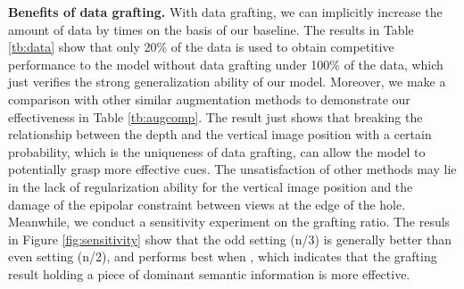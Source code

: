 \documentclass[10pt,twocolumn,letterpaper]{article}
\begin{document}
\noindent
{\bf Benefits of data grafting.} With data grafting, we can implicitly increase the 
amount of data by  times on the basis of our baseline. The 
results in Table \ref{tb:data} show that only 20\% of the data is used to obtain 
competitive performance to the model without data grafting under 100\% of the data, 
which just verifies the strong generalization ability of our model. Moreover, we 
make a comparison with other similar augmentation methods to demonstrate our 
effectiveness in Table \ref{tb:augcomp}. The result just shows that breaking the 
relationship between the depth and the vertical image position with a 
certain probability, which is the uniqueness of data grafting, can allow the model to 
potentially grasp more effective cues. The unsatisfaction of other methods may lie in 
the lack of regularization ability for the vertical image position and the damage of the 
epipolar constraint between views at the edge of the hole. Meanwhile, we 
conduct a sensitivity experiment on the grafting ratio. The resuls in Figure 
\ref{fig:sensitivity} show that the odd setting (\eg n/3) is generally better than 
even setting (\eg n/2), and performs best when , which indicates that the grafting 
result holding a piece of dominant semantic information is more effective. 

\begin{table}
   \begin{center}
   \end{center}
   \caption{{\bf Ablation study on distillation source.} PP refers to the post-processing 
   result of the largest scale in the decoder.}
   \label{tb:distill_source}
\end{table}
\end{document}

